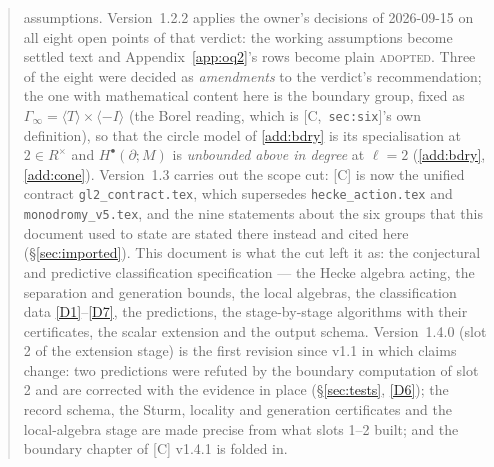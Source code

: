\documentclass[11pt]{article}
\theoremstyle{remark}
\newcommand{\Ga}{\Gamma}
\newcommand{\HA}[1]{[C,~\texttt{#1}]}      %
\begin{document}
\begin{quote}
assumptions. Version~1.2.2 applies the owner's decisions of 2026-09-15 on all eight open points of
that verdict: the working assumptions become settled text and Appendix~\ref{app:oq2}'s rows become
plain \textsc{adopted}. Three of the eight were decided as \emph{amendments} to the verdict's
recommendation; the one with mathematical content here is the boundary group, fixed as
$\Ga_\infty=\langle T\rangle\times\langle-I\rangle$ (the Borel reading, which is \HA{sec:six}'s own
definition), so that the circle model of \ref{add:bdry} is its specialisation at $2\in R^\times$ and
$H^\bullet(\partial;M)$ is \emph{unbounded above in degree} at $\ell=2$ (\ref{add:bdry}, \ref{add:cone}).
Version~1.3 carries out the scope cut: [C] is now the unified contract
\texttt{gl2\_contract.tex}, which supersedes \texttt{hecke\_action.tex} and
\texttt{monodromy\_v5.tex}, and the nine statements about the six groups that this document
used to state are stated there instead and cited here (\S\ref{sec:imported}). This document is
what the cut left it as: the conjectural and predictive classification specification --- the
Hecke algebra acting, the separation and generation bounds, the local algebras, the
classification data \ref{D1}--\ref{D7}, the predictions, the stage-by-stage algorithms with
their certificates, the scalar extension and the output schema. Version~1.4.0 (slot 2 of the
extension stage) is the first revision since v1.1 in which claims change: two predictions were
refuted by the boundary computation of slot 2 and are corrected with the evidence in place
(\S\ref{sec:tests}, \ref{D6}); the record schema, the Sturm, locality and generation certificates
and the local-algebra stage are made precise from what slots 1--2 built; and the boundary chapter
of [C] v1.4.1 is folded in.
\end{quote}
\end{document}
